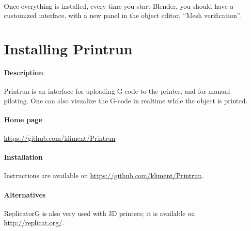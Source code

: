 \documentclass{article}
\begin{document}
	\paragraph{}
	Once everything is installed, every time you start Blender, you should have a customized interface, with a new panel in the object editor, “Mesh verification”.

\newpage

\section{Installing Printrun}

	\paragraph{Description} Printrun is an interface for uploading G-code to the printer, and for manual piloting. One can also visualize the G-code in realtime while the object is printed.

	\paragraph{Home page} \url{https://github.com/kliment/Printrun}

	\paragraph{Installation} Instructions are available on \url{https://github.com/kliment/Printrun}.

	\paragraph{Alternatives} ReplicatorG is also very used with 3D printers; it is available on \url{http://replicat.org/}.
\end{document}
